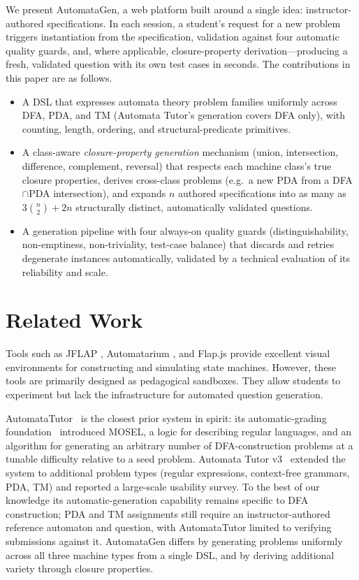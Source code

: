 \documentclass[sigconf]{acmart}
\begin{document}
We present AutomataGen, a web platform built around a single idea: instructor-authored specifications. 
In each session, a student's request for a new problem triggers instantiation from the specification, 
validation against four automatic quality guards, and, where applicable, closure-property derivation---producing a fresh, validated question with its own test cases in seconds. 
The contributions in this paper are as follows.

\begin{itemize}
  \item A DSL that expresses automata theory problem families uniformly across DFA, PDA, and TM (Automata Tutor's generation covers DFA only), with counting, length, ordering, and structural-predicate primitives.
  \item A class-aware \emph{closure-property generation} mechanism (union, intersection, difference, complement, reversal) that respects each machine class's true closure properties, derives cross-class problems (e.g.\ a new PDA from a DFA$\cap$PDA intersection), and expands $n$ authored specifications into as many as $3\binom{n}{2}+2n$ structurally distinct, automatically validated questions.
  \item A generation pipeline with four always-on quality guards (distinguishability, non-emptiness, non-triviality, test-case balance) that discards and retries degenerate instances automatically, validated by a technical evaluation of its reliability and scale.
\end{itemize}

\section{Related Work}
\label{sec:related-work}

Tools such as JFLAP \cite{rodger2006jflap}, Automatarium \cite{automatarium}, and Flap.js \cite{flapjs} provide excellent visual environments for constructing and simulating state machines. However, these tools are primarily designed as pedagogical sandboxes. They allow students to experiment but lack the infrastructure for automated question generation.

AutomataTutor~\cite{dantoni2015automata,dantoni2020automata} is the closest prior system in spirit: its automatic-grading foundation~\cite{alur2013automated} introduced MOSEL, a logic for describing regular languages, and an algorithm for generating an arbitrary number of DFA-construction problems at a tunable difficulty relative to a seed problem. Automata Tutor v3~\cite{dantoni2020automata} extended the system to additional problem types (regular expressions, context-free grammars, PDA, TM) and reported a large-scale usability survey. To the best of our knowledge its automatic-generation capability remains specific to DFA construction; PDA and TM assignments still require an instructor-authored reference automaton and question, with AutomataTutor limited to verifying submissions against it. AutomataGen differs by generating problems uniformly across all three machine types from a single DSL, and by deriving additional variety through closure properties.
\end{document}
